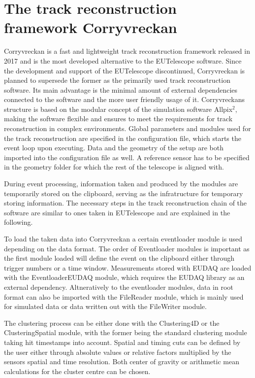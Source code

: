 \section{The track reconstruction framework Corryvreckan}
Corryvreckan is a fast and lightweight track reconstruction framework released in 2017 and is the most developed alternative to the EUTelescope software.
Since the development and support of the EUTelescope discontinued, Corryvreckan is planned to supersede the former as the primarily used track
reconstruction software. Its main advantage is the minimal amount of external dependencies connected to the software and the more user friendly usage of
it.
Corryvreckans structure is based on the modular concept of the simulation software Allpix$^2$, making the software flexible and ensures to meet the requirements for track reconstruction in
complex environments. Global parameters and modules used for the track reconstruction are specified in the configuration file, which starts the event loop upon
executing. Data and the geometry of the setup are both imported into the configuration file as well. A reference sensor has to be specified in the geometry folder
for which the rest of the telescope is aligned with.

During event processing, information taken and produced by the modules are temporarily stored on the clipboard, serving as the infratructure for temporary
storing information. %
The necessary steps in the track reconstruction chain of the software are similar to ones taken in EUTelescope and are explained in the following.

To load the taken data into Corryvreckan a certain eventloader module is used depending on the data format. The order of Eventloader modules
is important as the first module loaded will define the event on the clipboard either through trigger numbers or a time window. Measurements stored with EUDAQ are loaded with the
EventloaderEUDAQ module, which requires the EUDAQ library as an external dependency. Altneratively to the eventloader modules, data in root format can also be imported
with the FileReader module, which is mainly used for simulated data or data written out with the FileWriter module.

The clustering process can be either done with the Clustering4D or the ClusteringSpatial module, with the former being the standard clustering module taking hit timestamps
into account. Spatial and timing cuts can be defined by the user either through absolute values or relative factors multiplied by the sensors spatial and time resolution. Both
center of gravity or arithmetic mean calculations for the cluster centre can be chosen.



